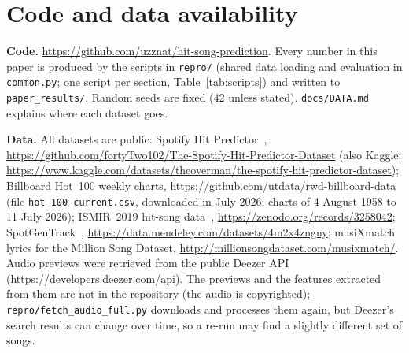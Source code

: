 \documentclass[conference]{IEEEtran}
\newcommand{\repourl}{https://github.com/uzznat/hit-song-prediction}
\begin{document}
\section*{Code and data availability}
\textbf{Code.} \url{\repourl}. Every number in this paper is produced by the scripts in
\texttt{repro/} (shared data loading and evaluation in \texttt{common.py}; one script per
section, Table~\ref{tab:scripts}) and written to \texttt{paper\_results/}. Random seeds are fixed (42 unless
stated). \texttt{docs/DATA.md} explains where each dataset goes.

\textbf{Data.} All datasets are public:
Spotify Hit Predictor~\cite{ansari2020dataset}, \url{https://github.com/fortyTwo102/The-Spotify-Hit-Predictor-Dataset}
(also Kaggle: \url{https://www.kaggle.com/datasets/theoverman/the-spotify-hit-predictor-dataset});
Billboard Hot~100 weekly charts, \url{https://github.com/utdata/rwd-billboard-data} (file \texttt{hot-100-current.csv},
downloaded in July 2026; charts of 4 August 1958 to 11 July 2026);
ISMIR~2019 hit-song data~\cite{zangerle2019hit}, \url{https://zenodo.org/records/3258042};
SpotGenTrack~\cite{martingutierrez2020multimodal}, \url{https://data.mendeley.com/datasets/4m2x4zngny};
musiXmatch lyrics for the Million Song Dataset, \url{http://millionsongdataset.com/musixmatch/}.
Audio previews were retrieved from the public Deezer API (\url{https://developers.deezer.com/api}). The
previews and the features extracted from them are not in the repository (the audio is copyrighted);
\texttt{repro/fetch\_audio\_full.py} downloads and processes them again, but Deezer's search results can change
over time, so a re-run may find a slightly different set of songs.

\FloatBarrier


\end{document}
